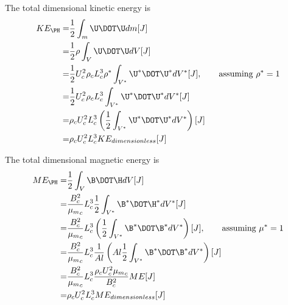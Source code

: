 \documentclass[11pt]{article}
\begin{document}
\doublespacing
\MOONSTITLE
\maketitle

The total dimensional kinetic energy is
\begin{equation}\begin{aligned}
KE_{\PH} =& \frac{1}{2} \int_m \U \DOT \U dm [J] \\
         =& \frac{1}{2} \rho \int_V \U \DOT \U dV [J] \\
         =& \frac{1}{2} U_c^2 \rho_c L_c^3 \rho^* \int_{V^*} \U^* \DOT \U^* dV^* [J], \qquad \text{assuming $\rho^*=1$} \\
         =& \frac{1}{2} U_c^2 \rho_c L_c^3        \int_{V^*} \U^* \DOT \U^* dV^* [J] \\
         =& \rho_c U_c^2 L_c^3 \left( \frac{1}{2} \int_{V^*} \U^* \DOT \U^* dV^* \right) [J] \\
         =& \rho_c U_c^2 L_c^3 KE_{dimensionless} [J] \\
\end{aligned}\end{equation}

The total dimensional magnetic energy is
\begin{equation}\begin{aligned}
ME_{\PH} =& \frac{1}{2} \int_V \B \DOT \H dV [J] \\
         =& \frac{B_c^2}{{\mu_m}_c} L_c^3 \frac{1}{2} \int_{V^*} \B^* \DOT \H^* dV^* [J] \\
         =& \frac{B_c^2}{{\mu_m}_c} L_c^3 \left( \frac{1}{2} \int_{V^*} \B^* \DOT \B^* dV^* \right) [J], \qquad \text{assuming $\mu^*=1$} \\
         =& \frac{B_c^2}{{\mu_m}_c} L_c^3 \frac{1}{Al} \left( Al \frac{1}{2} \int_{V^*} \B^* \DOT \B^* dV^* \right) [J] \\
         =& \frac{B_c^2}{{\mu_m}_c} L_c^3 \frac{\rho_c U_c^2 {\mu_m}_c}{B_c^2} ME [J] \\
         =& \rho_c U_c^2 L_c^3 ME_{dimensionless} [J] \\
\end{aligned}\end{equation}
\end{document}
